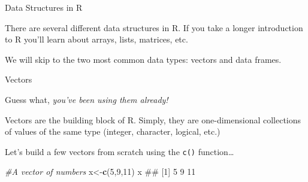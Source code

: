 \documentclass[ignorenonframetext,]{beamer}
\newenvironment{Shaded}{\begin{snugshade}}{\end{snugshade}}
\newcommand{\KeywordTok}[1]{\textcolor[rgb]{0.13,0.29,0.53}{\textbf{#1}}}
\newcommand{\DecValTok}[1]{\textcolor[rgb]{0.00,0.00,0.81}{#1}}
\newcommand{\CommentTok}[1]{\textcolor[rgb]{0.56,0.35,0.01}{\textit{#1}}}
\newcommand{\NormalTok}[1]{#1}
\begin{document}
\begin{frame}{Data Structures in R}

There are several different data structures in R. If you take a longer
introduction to R you'll learn about arrays, lists, matrices, etc.

We will skip to the two most common data types: vectors and data frames.

\end{frame}

\begin{frame}[fragile]{Vectors}

Guess what, \emph{you've been using them already!}

Vectors are the building block of R. Simply, they are one-dimensional
collections of values of the same type (integer, character, logical,
etc.)

\begin{block}{Let's build a few vectors from scratch using the
\texttt{c()} function\ldots{}}

\begin{Shaded}
\begin{Highlighting}[]
\CommentTok{#A vector of numbers}
\NormalTok{x<-}\KeywordTok{c}\NormalTok{(}\DecValTok{5}\NormalTok{,}\DecValTok{9}\NormalTok{,}\DecValTok{11}\NormalTok{)}
\NormalTok{x}
\NormalTok{## [1]  5  9 11}
\end{Highlighting}
\end{Shaded}

\end{block}

\end{frame}
\end{document}

